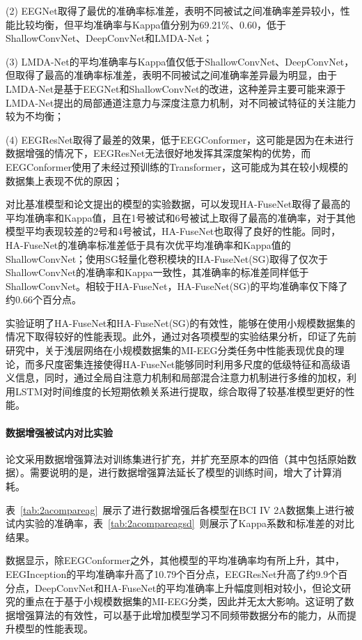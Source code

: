 (2) EEGNet取得了最优的准确率标准差，表明不同被试之间准确率差异较小，性能比较均衡，但平均准确率与Kappa值分别为69.21\%、0.60，低于ShallowConvNet、DeepConvNet和LMDA-Net；

(3) LMDA-Net的平均准确率与Kappa值仅低于ShallowConvNet、DeepConvNet，但取得了最高的准确率标准差，表明不同被试之间准确率差异最为明显，由于LMDA-Net是基于EEGNet和ShallowConvNet的改进，这种差异主要可能来源于LMDA-Net提出的局部通道注意力与深度注意力机制，对不同被试特征的关注能力较为不均衡；

(4) EEGResNet取得了最差的效果，低于EEGConformer，这可能是因为在未进行数据增强的情况下，EEGResNet无法很好地发挥其深度架构的优势，而EEGConformer使用了未经过预训练的Transformer，这可能成为其在较小规模的数据集上表现不优的原因；

对比基准模型和论文提出的模型的实验数据，可以发现HA-FuseNet取得了最高的平均准确率和Kappa值，且在1号被试和6号被试上取得了最高的准确率，对于其他模型平均表现较差的2号和4号被试，HA-FuseNet也取得了良好的性能。同时，HA-FuseNet的准确率标准差低于具有次优平均准确率和Kappa值的ShallowConvNet；使用SG轻量化卷积模块的HA-FuseNet(SG)取得了仅次于ShallowConvNet的准确率和Kappa一致性，其准确率的标准差同样低于ShallowConvNet。相较于HA-FuseNet，HA-FuseNet(SG)的平均准确率仅下降了约0.66个百分点。

实验证明了HA-FuseNet和HA-FuseNet(SG)的有效性，能够在使用小规模数据集的情况下取得较好的性能表现。此外，通过对各项模型的实验结果分析，印证了先前研究中，关于浅层网络在小规模数据集的MI-EEG分类任务中性能表现优良的理论，而多尺度密集连接使得HA-FuseNet能够同时利用多尺度的低级特征和高级语义信息，同时，通过全局自注意力机制和局部混合注意力机制进行多维的加权，利用LSTM对时间维度的长短期依赖关系进行提取，综合取得了较基准模型更好的性能。

\paragraph{数据增强被试内对比实验}

论文采用数据增强算法对训练集进行扩充，并扩充至原本的四倍（其中包括原始数据）。需要说明的是，进行数据增强算法延长了模型的训练时间，增大了计算消耗。

表~\ref{tab:2acompareag}~展示了进行数据增强后各模型在BCI IV 2A数据集上进行被试内实验的准确率，表~\ref{tab:2acompareagsd}~则展示了Kappa系数和标准差的对比结果。

数据显示，除EEGConformer之外，其他模型的平均准确率均有所上升，其中，EEGInception的平均准确率升高了10.79个百分点，EEGResNet升高了约9.9个百分点，DeepConvNet和HA-FuseNet的平均准确率上升幅度则相对较小，但论文研究的重点在于基于小规模数据集的MI-EEG分类，因此并无太大影响。这证明了数据增强算法的有效性，可以基于此增加模型学习不同频带数据分布的能力，从而提升模型的性能表现。

